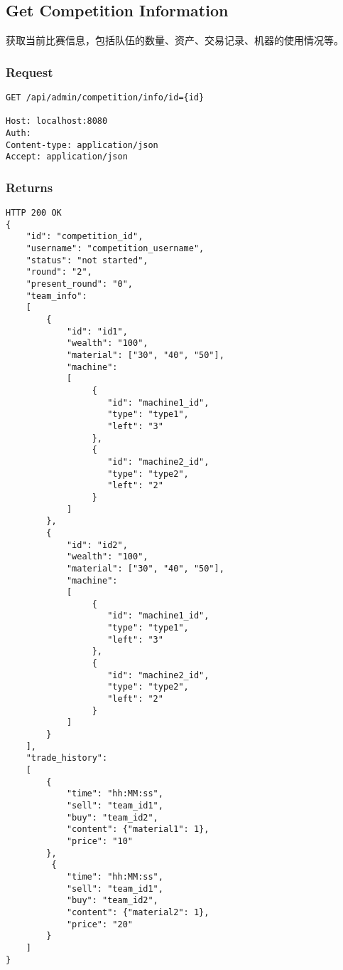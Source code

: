 \documentclass{article}
\begin{document}
\subsection{Get Competition Information}
获取当前比赛信息，包括队伍的数量、资产、交易记录、机器的使用情况等。

\subsubsection*{Request}
\begin{lstlisting}
GET /api/admin/competition/info/id={id}

Host: localhost:8080
Auth:
Content-type: application/json
Accept: application/json
\end{lstlisting}

\subsubsection*{Returns}
\begin{lstlisting}
HTTP 200 OK
{
    "id": "competition_id",
    "username": "competition_username",
    "status": "not started",
    "round": "2",
    "present_round": "0",
    "team_info":
    [
        {
            "id": "id1",
            "wealth": "100",
            "material": ["30", "40", "50"],
            "machine":
            [
                 {
                    "id": "machine1_id",
                    "type": "type1",
                    "left": "3"
                 },
                 {
                    "id": "machine2_id",
                    "type": "type2",
                    "left": "2"
                 }
            ]
        },
        {
            "id": "id2",
            "wealth": "100",
            "material": ["30", "40", "50"],
            "machine":
            [
                 {
                    "id": "machine1_id",
                    "type": "type1",
                    "left": "3"
                 },
                 {
                    "id": "machine2_id",
                    "type": "type2",
                    "left": "2"
                 }
            ]
        }
    ],
    "trade_history":
    [
        {
            "time": "hh:MM:ss",
            "sell": "team_id1",
            "buy": "team_id2",
            "content": {"material1": 1},
            "price": "10"
        },
         {
            "time": "hh:MM:ss",
            "sell": "team_id1",
            "buy": "team_id2",
            "content": {"material2": 1},
            "price": "20"
        }
    ]
}

\end{lstlisting}
\end{document}
